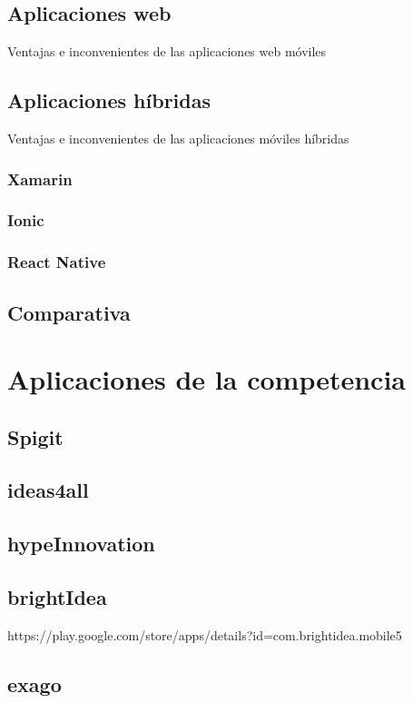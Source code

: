 \subsection{Aplicaciones web}

\begin{table}[web]
	\centering
	{\small
		
	}
	\caption[Ventajas e inconvenientes de las aplicaciones web móviles]
	{Ventajas e inconvenientes de las aplicaciones web móviles~\cite{TIPAPP}}
	\label{tab:web}
\end{table}

\subsection{Aplicaciones híbridas}

\begin{table}[hibridas]
	\centering
	{\small
		
	}
	\caption[Ventajas e inconvenientes de las aplicaciones móviles híbridas]
	{Ventajas e inconvenientes de las aplicaciones móviles híbridas~\cite{TIPAPP}}
	\label{tab:hibridas}
\end{table}

\subsubsection{Xamarin}
\subsubsection{Ionic}
\subsubsection{React Native}

\subsection{Comparativa}


\section{Aplicaciones de la competencia}
\subsection{Spigit}
\subsection{ideas4all}
\subsection{hypeInnovation}
\subsection{brightIdea}
https://play.google.com/store/apps/details?id=com.brightidea.mobile5
\subsection{exago}

